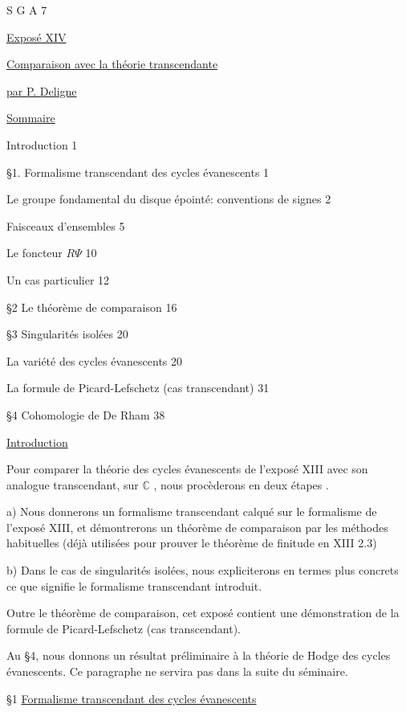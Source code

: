 


S G A  7


\underline{Exposé XIV}


\underline{Comparaison avec la théorie transcendante}


\underline{par P. Deligne}


\underline{Sommaire}

\quad Introduction \hfill 1

\S 1. \quad Formalisme transcendant des cycles évanescents \hfill 1

 Le groupe fondamental du disque épointé: conventions de signes \hfill 2

 Faisceaux d'ensembles \hfill 5

 Le foncteur $R\Psi$ \hfill 10

 Un cas particulier \hfill 12

\S 2 \quad Le théorème de comparaison \hfill 16

\S 3 \quad Singularités isolées \hfill 20

 La variété des cycles évanescents \hfill 20

 La formule de Picard-Lefschetz (cas transcendant) \hfill 31

\S 4 \quad Cohomologie de De Rham \hfill 38


\underline{Introduction}

Pour comparer la théorie des cycles évanescents de l'exposé XIII avec son analogue transcendant, sur $\mathbb{C}$ , nous procèderons en deux étapes .

a) Nous donnerons un formalisme transcendant calqué sur le formalisme de l'exposé XIII, et démontrerons un théorème de comparaison par les méthodes habituelles (déjà utilisées pour prouver le théorème de finitude en XIII 2.3)

b) Dans le cas de singularités isolées, nous expliciterons en termes plus concrets ce que signifie le formalisme transcendant introduit.

Outre le théorème de comparaison, cet exposé contient une démonstration de la formule de Picard-Lefschetz (cas transcendant).



Au \S 4, nous donnons un résultat préliminaire à la théorie de Hodge des cycles évanescents. Ce paragraphe ne servira pas dans la suite du séminaire.


\S 1 \underline{Formalisme transcendant des cycles évanescents}


